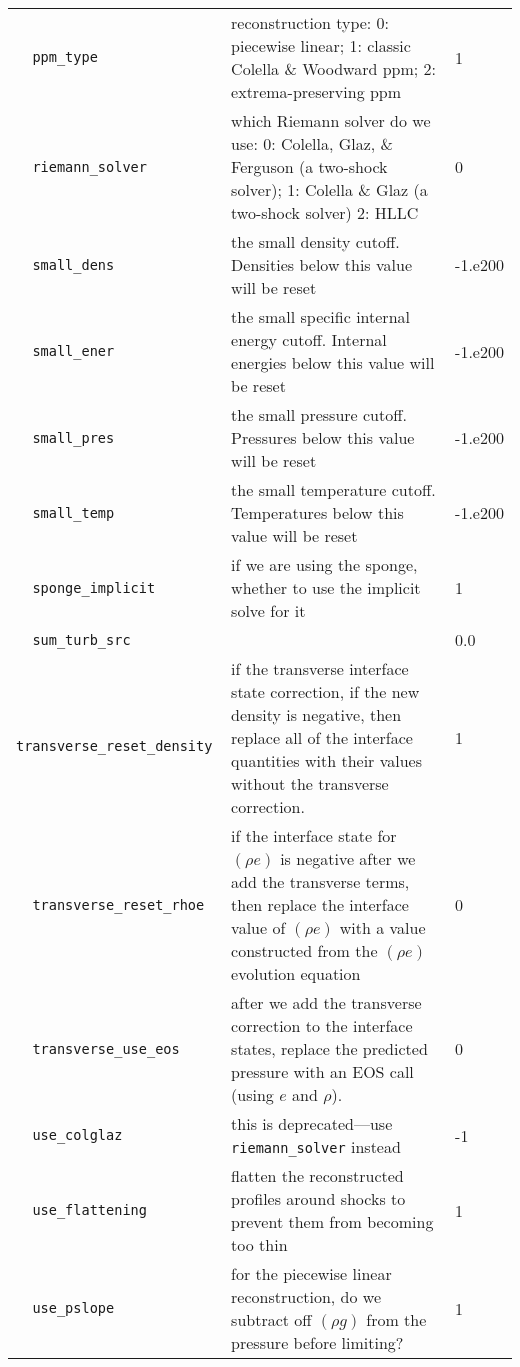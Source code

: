 \begin{landscape}
{\begin{center}
\begin{longtable}{|l|p{5.25in}|l|}
\rowcolor{tableShade}
\verb=  ppm_type  = &   reconstruction type: 0: piecewise linear; 1: classic Colella \& Woodward ppm; 2: extrema-preserving ppm  &  1 \\
\verb=  riemann_solver  = &   which Riemann solver do we use: 0: Colella, Glaz, \& Ferguson (a two-shock solver); 1: Colella \& Glaz (a two-shock solver) 2: HLLC  &  0 \\
\rowcolor{tableShade}
\verb=  small_dens  = &   the small density cutoff.  Densities below this value will be reset  &  -1.e200 \\
\verb=  small_ener  = &   the small specific internal energy cutoff.  Internal energies below this value will be reset  &  -1.e200 \\
\rowcolor{tableShade}
\verb=  small_pres  = &   the small pressure cutoff.  Pressures below this value will be reset  &  -1.e200 \\
\verb=  small_temp  = &   the small temperature cutoff.  Temperatures below this value will be reset  &  -1.e200 \\
\rowcolor{tableShade}
\verb=  sponge_implicit  = &   if we are using the sponge, whether to use the implicit solve for it  &  1 \\
\verb=  sum_turb_src  = &    &  0.0 \\
\rowcolor{tableShade}
\verb=  transverse_reset_density  = &   if the transverse interface state correction, if the new density is negative, then replace all of the interface quantities with their values without the transverse correction.  &  1 \\
\verb=  transverse_reset_rhoe  = &   if the interface state for $(\rho e)$ is negative after we add the transverse terms, then replace the interface value of $(\rho e)$ with a value constructed from the $(\rho e)$ evolution equation  &  0 \\
\rowcolor{tableShade}
\verb=  transverse_use_eos  = &   after we add the transverse correction to the interface states, replace the predicted pressure with an EOS call (using $e$ and $\rho$).  &  0 \\
\verb=  use_colglaz  = &   this is deprecated---use {\tt riemann\_solver} instead  &  -1 \\
\rowcolor{tableShade}
\verb=  use_flattening  = &   flatten the reconstructed profiles around shocks to prevent them from becoming too thin  &  1 \\
\verb=  use_pslope  = &   for the piecewise linear reconstruction, do we subtract off $(\rho g)$ from the pressure before limiting?  &  1 \\



\end{longtable}
\end{center}}
\end{landscape}
